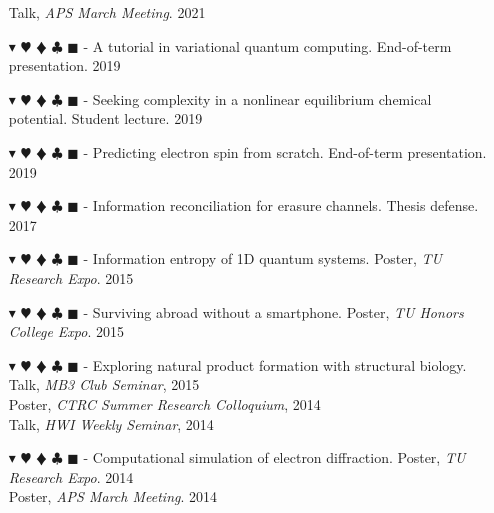 \documentclass[overlapped, 10pt]{res} %
\newcommand{\physics}{$\blacktriangledown$}
\newcommand{\biochem}{$\varheartsuit$}
\newcommand{\shannon}{$\vardiamondsuit$}
\newcommand{\classic}{$\clubsuit$}
\newcommand{\quantum}{$\blacksquare$}
\newcommand{\physicscolor}{\color{YellowOrange}}
\newcommand{\biochemcolor}{\color{Emerald}}
\newcommand{\shannoncolor}{\color{Goldenrod}}
\newcommand{\classiccolor}{\color{Cyan}}
\newcommand{\quantumcolor}{\color{RedOrange}}
\newcommand{\tag}[1]{
    {\IfSubStr{#1}{\physics}{\physicscolor}{\color{White}}\physics}
    {\IfSubStr{#1}{\biochem}{\biochemcolor}{\color{White}}\biochem}
    {\IfSubStr{#1}{\shannon}{\shannoncolor}{\color{White}}\shannon}
    {\IfSubStr{#1}{\classic}{\classiccolor}{\color{White}}\classic}
    {\IfSubStr{#1}{\quantum}{\quantumcolor}{\color{White}}\quantum}
}
\begin{document}
\begin{resume}
\begin{itemize}
    \hfill Talk, \textit{APS March Meeting}. 2021
\item[\tag{\physics\quantum}-] A tutorial in variational quantum computing.
    \hfill End-of-term presentation. 2019
\item[\tag{\biochem}-] Seeking complexity in a nonlinear equilibrium chemical potential.
    \hfill Student lecture. 2019
\item[\tag{\physics}-] Predicting electron spin from scratch.
    \hfill End-of-term presentation. 2019
\item[\tag{\shannon\classic}-] Information reconciliation for erasure channels.
    \hfill Thesis defense. 2017
\item[\tag{\physics\shannon\classic}-] Information entropy of 1D quantum systems.
    \hfill Poster, \textit{TU Research Expo}. 2015
\item[\tag{}-] Surviving abroad without a smartphone.
    \hfill Poster, \textit{TU Honors College Expo}. 2015
\item[\tag{\biochem\classic}-] Exploring natural product formation with structural biology.
    \hfill Talk, \textit{MB3 Club Seminar}, 2015
    \\ \null \hfill Poster, \textit{CTRC Summer Research Colloquium}, 2014
    \\ \null \hfill Talk, \textit{HWI Weekly Seminar}, 2014
\item[\tag{\physics\classic}-] Computational simulation of electron diffraction.
    \hfill Poster, \textit{TU Research Expo}. 2014
    \\ \null \hfill Poster, \textit{APS March Meeting}. 2014
\end{itemize}



\end{resume}
\end{document}
